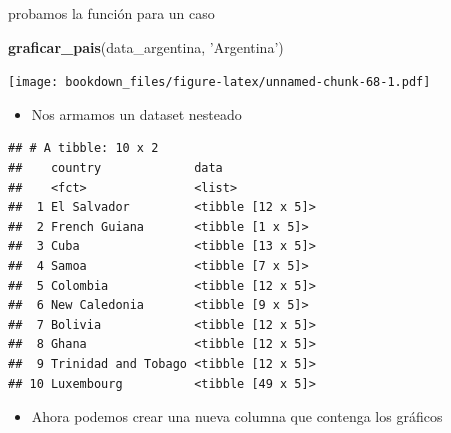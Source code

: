\documentclass[]{book}
\newenvironment{Shaded}{\begin{snugshade}}{\end{snugshade}}
\newcommand{\DataTypeTok}[1]{\textcolor[rgb]{0.13,0.29,0.53}{#1}}
\newcommand{\DecValTok}[1]{\textcolor[rgb]{0.00,0.00,0.81}{#1}}
\newcommand{\KeywordTok}[1]{\textcolor[rgb]{0.13,0.29,0.53}{\textbf{#1}}}
\newcommand{\NormalTok}[1]{#1}
\newcommand{\OperatorTok}[1]{\textcolor[rgb]{0.81,0.36,0.00}{\textbf{#1}}}
\newcommand{\StringTok}[1]{\textcolor[rgb]{0.31,0.60,0.02}{#1}}
\providecommand{\tightlist}{%
  \setlength{\itemsep}{0pt}\setlength{\parskip}{0pt}}
\begin{document}
probamos la función para un caso

\begin{Shaded}
\begin{Highlighting}[]
\KeywordTok{graficar_pais}\NormalTok{(data_argentina, }\StringTok{'Argentina'}\NormalTok{)}
\end{Highlighting}
\end{Shaded}

\texttt{[image: bookdown\_files/figure-latex/unnamed-chunk-68-1.pdf]}

\begin{itemize}
\tightlist
\item
  Nos armamos un dataset nesteado
\end{itemize}

\begin{Shaded}
\end{Shaded}

\begin{verbatim}
## # A tibble: 10 x 2
##    country             data             
##    <fct>               <list>           
##  1 El Salvador         <tibble [12 x 5]>
##  2 French Guiana       <tibble [1 x 5]> 
##  3 Cuba                <tibble [13 x 5]>
##  4 Samoa               <tibble [7 x 5]> 
##  5 Colombia            <tibble [12 x 5]>
##  6 New Caledonia       <tibble [9 x 5]> 
##  7 Bolivia             <tibble [12 x 5]>
##  8 Ghana               <tibble [12 x 5]>
##  9 Trinidad and Tobago <tibble [12 x 5]>
## 10 Luxembourg          <tibble [49 x 5]>
\end{verbatim}

\begin{itemize}
\tightlist
\item
  Ahora podemos crear una nueva columna que contenga los gráficos
\end{itemize}

\begin{Shaded}
\end{Shaded}
\end{document}
